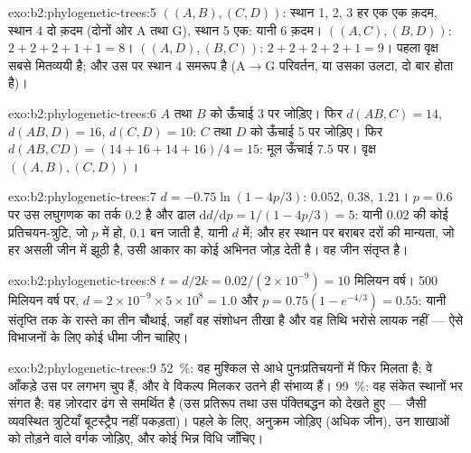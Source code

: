 \begin{solution}{exo:b2:phylogenetic-trees:5}
$((A,B),(C,D))$: स्थान 1, 2, 3 हर एक एक क़दम, स्थान 4 दो क़दम
(दोनों ओर $\mathrm{A}$ तथा $\mathrm{G}$), स्थान 5 एक: यानी 6 क़दम।
$((A,C),(B,D))$: $2 + 2 + 2 + 1 + 1 = 8$। $((A,D),(B,C))$: $2 + 2 + 2 +
2 + 1 = 9$। पहला वृक्ष सबसे मितव्ययी है; और उस पर स्थान 4
समरूप है ($\mathrm{A}\to\mathrm{G}$ परिवर्तन, या उसका उलटा,
दो बार होता है)।
\end{solution}

\begin{solution}{exo:b2:phylogenetic-trees:6}
$A$ तथा $B$ को ऊँचाई 3 पर जोड़िए। फिर $d(AB,C) = 14$, $d(AB,D) = 16$,
$d(C,D) = 10$: $C$ तथा $D$ को ऊँचाई 5 पर जोड़िए। फिर $d(AB,CD) = (14 + 16
+ 14 + 16)/4 = 15$: मूल ऊँचाई $7.5$ पर। वृक्ष $((A,B),(C,D))$।
\end{solution}

\begin{solution}{exo:b2:phylogenetic-trees:7}
$d = -0.75\ln(1 - 4p/3)$: $0.052$, $0.38$, $1.21$। $p = 0.6$ पर उस
लघुगणक का तर्क $0.2$ है और ढाल $\mathrm{d}d/\mathrm{d}p
= 1/(1 - 4p/3) = 5$: यानी $0.02$ की कोई प्रतिचयन-त्रुटि, जो $p$ में हो,
$0.1$ बन जाती है, यानी $d$ में; और हर स्थान पर बराबर दरों की मान्यता,
जो हर असली जीन में झूठी है, उसी आकार का कोई अभिनत जोड़ देती है। वह जीन
संतृप्त है।
\end{solution}

\begin{solution}{exo:b2:phylogenetic-trees:8}
$t = d/2k = 0.02/(2\times 10^{-9}) = 10$ मिलियन वर्ष। 500
मिलियन वर्ष पर, $d = 2\times 10^{-9}\times 5\times 10^{8} = 1.0$ और
$p = 0.75(1 - e^{-4/3}) = 0.55$: यानी संतृप्ति तक के रास्ते का तीन
चौथाई, जहाँ वह संशोधन तीखा है और वह तिथि भरोसे लायक नहीं
--- ऐसे विभाजनों के लिए कोई धीमा जीन चाहिए।
\end{solution}

\begin{solution}{exo:b2:phylogenetic-trees:9}
\qty{52}{\%}: वह  मुश्किल से आधे पुनःप्रतिचयनों में फिर मिलता है;
वे आँकड़े उस पर लगभग चुप हैं, और वे विकल्प मिलकर
उतने ही संभाव्य हैं। \qty{99}{\%}: वह संकेत स्थानों भर
संगत है; वह  ज़ोरदार ढंग से समर्थित है (उस प्रतिरूप तथा उस
पंक्तिबद्धन को देखते हुए ---  जैसी व्यवस्थित त्रुटियाँ
बूटस्ट्रैप नहीं पकड़ता)। पहले के लिए, अनुक्रम जोड़िए (अधिक
जीन), उन शाखाओं को तोड़ने वाले वर्गक जोड़िए, और कोई भिन्न
विधि जाँचिए।
\end{solution}

